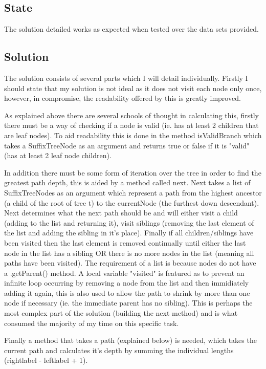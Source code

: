\documentclass[12pt]{article} %
\begin{document}
\subsection{State}
The solution detailed works as expected when tested over the data sets provided. 
\subsection{Solution}
The solution consists of several parts which I will detail individually. Firstly I should state
that my solution is not ideal as it does not visit each node only once, however, in compromise, the
readability offered by this is greatly improved. 

As explained above there are several schools of thought in calculating this, firstly there must be
a way of checking if a node is valid (ie. has at least 2 children that are leaf nodes). To aid
readability this is done in the method isValidBranch which takes a SuffixTreeNode as an argument
and returns true or false if it is "valid" (has at least 2 leaf node children).

In addition there must be some form of iteration over the tree in order to find the greatest path
depth, this is aided by a method called next. Next takes a list of SuffixTreeNodes as an argument
which represent a path from the highest ancestor (a child of the root of tree t) to the currentNode
(the furthest down descendant). Next determines what the next path should be and will either visit a
child (adding to the list and returning it), visit siblings (removing the last element of the list
and adding the sibling in it's place). Finally if all children/siblings have been visited then the last element is
removed continually until either the last node in the list has a sibling OR there is no more nodes in the list (meaning all paths have been visited).  The requirement of a list is because nodes do not have a .getParent() method. A local variable "visited" is featured as to
prevent an infinite loop occurring by removing a node from the list and then immidiately adding it
again, this is also used to allow the path to shrink by more than one node if necessary (ie. the immediate parent has no sibling). This is perhaps the most complex part of the solution (building the next method) and is what
consumed the majority of my time on this specific task.

Finally a method that takes a path (explained below) is needed, which takes the current path and
calculates it's depth by summing the individual lengths (rightlabel - leftlabel + 1).
\end{document}
